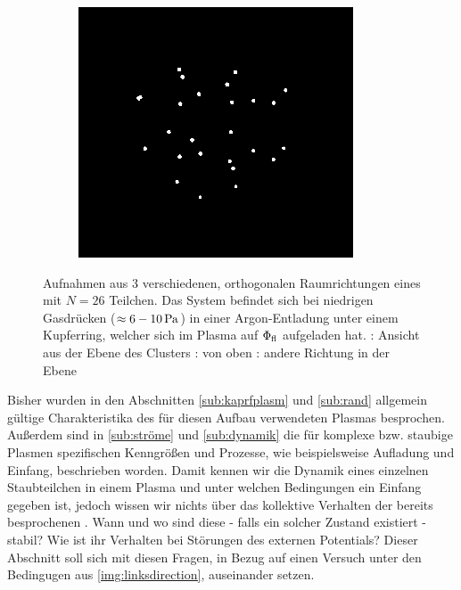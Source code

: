 \begin{figure}[!h]
\begin{subfigure}[b]{0.3\textwidth}
          \caption{}
          \label{img:links}
        \end{subfigure}
        \begin{subfigure}[b]{0.3\textwidth}
          \centering
          \includegraphics[width=\textwidth,height=\textwidth]{figs/gelb00011ungestrt.png}
          \caption{}
          \label{img:oben}
        \end{subfigure}
        \caption{Aufnahmen aus 3 verschiedenen, orthogonalen Raumrichtungen eines  mit $N=26$ Teilchen. Das System befindet sich bei niedrigen Gasdrücken ($\approx\unit[6-10]{Pa}$) in einer Argon-Entladung unter einem Kupferring, welcher sich im Plasma auf $\Phi_\text{fl}$ aufgeladen hat. : Ansicht aus der Ebene des Clusters : von oben : andere Richtung in der Ebene}
      \end{figure}

    Bisher wurden in den Abschnitten \ref{sub:kaprfplasm} und \ref{sub:rand} allgemein gültige Charakteristika des für diesen Aufbau verwendeten Plasmas besprochen. Außerdem sind in \ref{sub:ströme} und \ref{sub:dynamik} die für komplexe bzw. staubige Plasmen spezifischen Kenngrößen und Prozesse, wie beispielsweise Aufladung und Einfang, beschrieben worden. Damit kennen wir die Dynamik eines einzelnen Staubteilchen in einem Plasma und unter welchen Bedingungen ein Einfang gegeben ist, jedoch wissen wir nichts über das kollektive Verhalten der bereits besprochenen . Wann und wo sind diese - falls ein solcher Zustand existiert - stabil? Wie ist ihr Verhalten bei Störungen des externen Potentials? Dieser Abschnitt soll sich mit diesen Fragen, in Bezug auf einen Versuch unter den Bedingugen aus \autoref{img:linksdirection}, auseinander setzen.

